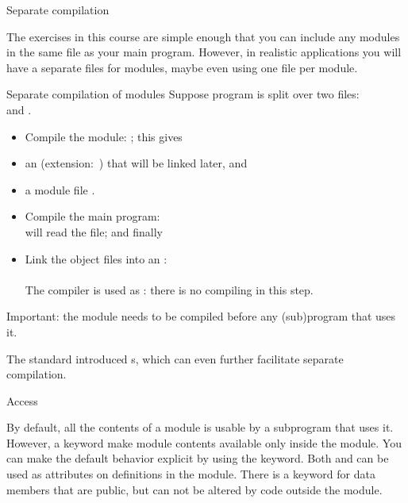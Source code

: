 {Separate compilation}

The exercises in this course are simple enough that you can
include any modules in the same file as your main program.
However, in realistic applications you will have
a separate files for modules, maybe even using one file per module.

\begin{block}{Separate compilation of modules}
  \label{sl:fcompile-mods}
  Suppose program is split over two files:\\
   and .
  \begin{itemize}
  \item Compile the module: ; this gives
  \item an  (extension:~)
    that will be linked later, and
  \item a module file .
  \item Compile the main program:\\
     will read the  file; and finally
  \item Link the object files into an :\\
    \\
    The compiler is used as : there is no compiling
    in this step.
  \end{itemize}
  Important: the module needs to be compiled before any (sub)program
  that uses it.
\end{block}

The  standard introduced s,
which can even further facilitate separate compilation.

 {Access}

By default, all the contents of a module is usable by a subprogram
that uses it. However, a keyword  make module
contents available only inside the module.
You can make the default behavior explicit by using the
 keyword. Both  and  can be used as
attributes on definitions in the module.
There is a keyword  for data members that
are public, but can not be altered by code outside the module.

\begin{multicols}{2}
\end{multicols}

